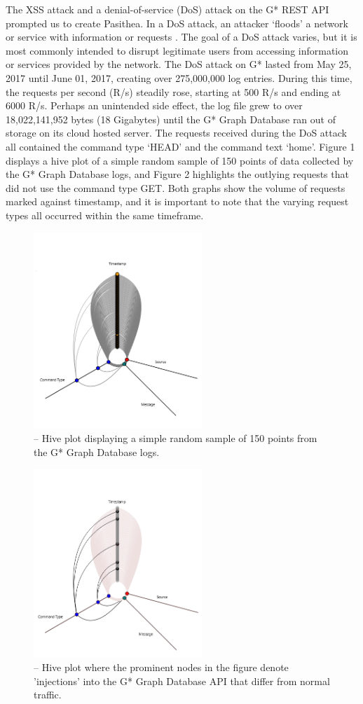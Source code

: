 \documentclass[10pt, conference]{IEEEtran}
\begin{document}
The XSS attack and a denial-of-service (DoS) attack on the G* REST API prompted us to create Pasithea. In a DoS attack, an attacker ‘floods’ a network or service with information or requests \cite{DoS-Def}. The goal of a DoS attack varies, but it is most commonly intended to disrupt legitimate users from accessing information or services provided by the network. The DoS attack on G* lasted from May 25, 2017 until June 01, 2017, creating over 275,000,000 log entries. During this time, the requests per second (R/s) steadily rose, starting at 500 R/s and ending at 6000 R/s. Perhaps an unintended side effect, the log file grew to over 18,022,141,952 bytes (18 Gigabytes) until the G* Graph Database ran out of storage on its cloud hosted server. The requests received during the DoS attack all contained the command type ‘HEAD’ and the command text ‘home’. Figure 1 displays a hive plot of a simple random sample of 150 points of data collected by the G* Graph Database logs, and Figure 2 highlights the outlying requests that did not use the command type GET. Both graphs show the volume of requests marked against timestamp, and it is important to note that the varying request types all occurred within the same timeframe.

\begin{figure}[h]
\centering
\includegraphics[width=2.5in]{images/regHive.png} 
\caption{-- Hive plot displaying a simple random sample of 150 points from the G* Graph Database logs.}
\end{figure}

\begin{figure}[h]
\centering
\includegraphics[width=2.5in]{images/uniqHive.png} 
\caption{-- Hive plot where the prominent nodes in the figure denote 'injections' into the G* Graph Database API that differ from normal traffic.}
\end{figure}
\end{document}

